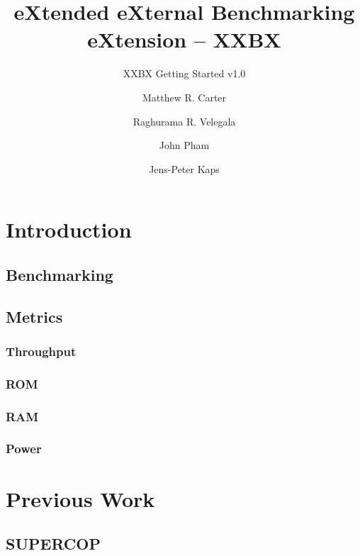 \documentclass[twoside,11pt]{cergdoc}
\begin{document}
\title{eXtended eXternal Benchmarking eXtension -- XXBX}
\subtitle{XXBX Getting Started v1.0}
\author{Matthew R. Carter \and Raghurama R. Velegala \and John Pham \and Jens-Peter Kaps}

\maketitle

\tableofcontents

\chapter{Introduction}
  \section{Benchmarking}
  \section{Metrics}
    \subsection{Throughput}
    \subsection{ROM}
    \subsection{RAM}
    \subsection{Power}
\chapter{Previous Work}
  \section{SUPERCOP}
\end{document}
